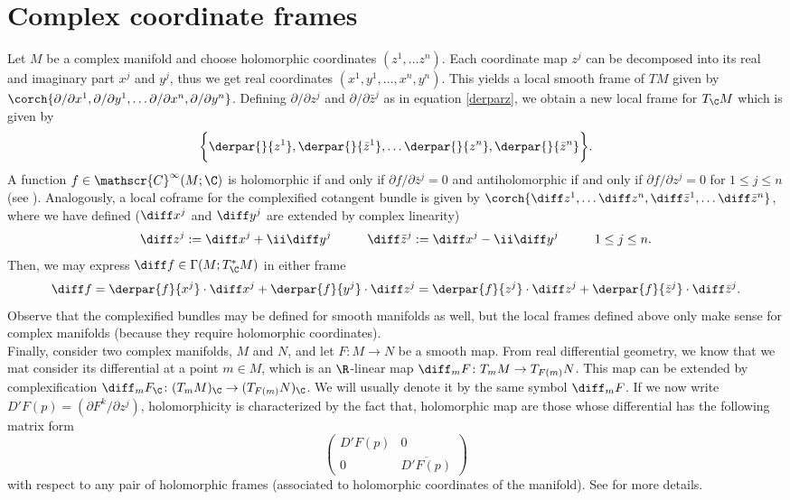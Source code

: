 \section{Complex coordinate frames}
Let \(M\) be a complex manifold and choose holomorphic coordinates \((z^1, \ldots z^n)\). Each coordinate map \(z^j\) can be decomposed into its real and imaginary part \(x^j\) and \(y^j\), thus we get real coordinates \((x^1, y^1, \ldots, x^n, y^n)\). This yields a local smooth frame of \(TM\) given by \(\corch{\partial/\partial x^1, \partial/\partial y^1, \ldots \partial/\partial x^n, \partial/\partial y^n}\). Defining \(\partial/\partial z^j\) and \(\partial/\partial\bar{z}^j\) as in equation \eqref{derparz}, we obtain a new local frame for \(T_\C M\) which is given by
\[
\bigg\lbrace{\derpar{}{z^1}, \derpar{}{\bar{z}^1}, \ldots \derpar{}{z^n}, \derpar{}{\bar{z}^n} \bigg\rbrace}.
\]
A function \(f \in \mathscr{C}^\infty(M;\C)\) is holomorphic if and only if \(\partial f /\partial \bar{z}^j=0\) and antiholomorphic if and only if \(\partial f/\partial z^j=0\) for \(1 \leq j \leq n\) (see \parencite[Prop. 1.4.2]{lee_introCM}). Analogously, a local coframe for the complexified cotangent bundle is given by \(\corch{\diff z^1, \ldots \diff z^n, \diff \bar{z}^1, \ldots \diff \bar{z}^n}\), where we have defined (\(\diff x^j\) and \(\diff y^j\) are extended by complex linearity)
\[
\diff z^j:= \diff x^j+\ii \diff y^j \hspace{1 cm}
\diff \bar{z}^j := \diff x^j- \ii \diff y^j \hspace{1 cm} 1 \leq j \leq n.
\]
Then, we may express \(\diff f \in \Gamma(M; T_\C^*M)\) in either frame
\begin{equation} \label{exp_diff}
\diff f=\derpar{f}{x^j} \cdot \diff x^j + \derpar{f}{y^j} \cdot \diff z^j = \derpar{f}{z^j}\cdot \diff z^j + \derpar{f}{\bar{z}^j}\cdot \diff \bar{z}^j.
\end{equation}
Observe that the complexified bundles may be defined for smooth manifolds as well, but the local frames defined above only make sense for complex manifolds (because they require holomorphic coordinates). \\

Finally, consider two complex manifolds, \(M\) and \(N\), and let \(F \colon M \to N\) be a smooth map. From real differential geometry, we know that we mat consider its differential at a point \(m \in M\), which is an \(\R\)-linear map \(\diff_mF\colon T_mM \to T_{F(m)}N\). This map can be extended by complexification \(\diff_m F_\C\colon (T_mM)_\C \to (T_{F(m)}N)_\C\). We will usually denote it by the same symbol \(\diff_m F\). If we now write \(D'F(p)=(\partial F^k/\partial z^j)\), holomorphicity is characterized by the fact that, holomorphic map are those whose differential has the following matrix form
\[
\begin{pmatrix}
    D'F(p) & 0 \\
    0 & \overline{D'F(p)}
\end{pmatrix}
\]
with respect to any pair of holomorphic frames (associated to holomorphic coordinates of the manifold). See \parencite[Ch. 1]{lee_introCM} for more details.

